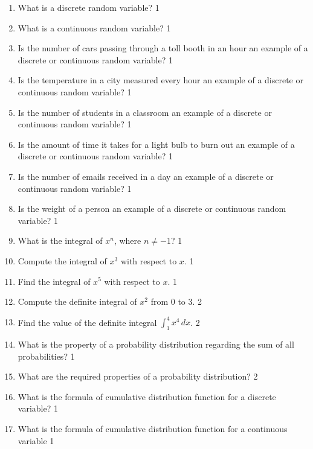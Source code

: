 \documentclass[a4paper,oneside, margin=1.4in]{book}
\begin{document}
  \begin{enumerate}

\item What is a discrete random variable? \hfill 1

\item What is a continuous random variable? \hfill 1

\item Is the number of cars passing through a toll booth in an hour an example of a discrete or continuous random variable? \hfill 1

\item Is the temperature in a city measured every hour an example of a discrete or continuous random variable? \hfill 1

\item Is the number of students in a classroom an example of a discrete or continuous random variable? \hfill 1

\item Is the amount of time it takes for a light bulb to burn out an example of a discrete or continuous random variable? \hfill 1

\item Is the number of emails received in a day an example of a discrete or continuous random variable? \hfill 1

\item Is the weight of a person an example of a discrete or continuous random variable? \hfill 1

\item What is the integral of \( x^n \), where \( n \neq -1 \)? \hfill 1

\item Compute the integral of \( x^3 \) with respect to \( x \). \hfill 1

\item Find the integral of \( x^5 \) with respect to \( x \). \hfill 1

\item Compute the definite integral of \( x^2 \) from 0 to 3. \hfill 2

\item Find the value of the definite integral \( \int_1^4 x^4 \, dx \). \hfill 2

\item What is the property of a probability distribution regarding the sum of all probabilities? \hfill 1

\item What are the required properties of a probability distribution? \hfill 2

\item What is the formula of cumulative distribution function for a discrete variable? \hfill 1

\item What is the formula of cumulative distribution function for a continuous variable \hfill 1


  \end{enumerate}
\end{document}
